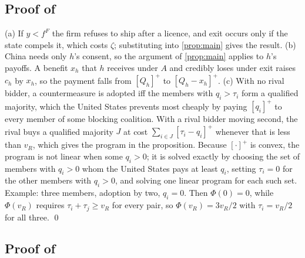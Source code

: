 \subsection*{Proof of }

(a) If $y < f^F$ the firm refuses to ship after a licence, and exit occurs only if the state compels it, which costs $\zeta$; substituting into \cref{prop:main} gives the result.
(b) China needs only $h$'s consent, so the argument of \cref{prop:main} applies to $h$'s payoffs. A benefit $x_h$ that $h$ receives under $A$ and credibly loses under exit raises $c_h$ by $x_h$, so the payment falls from $[Q_h]^+$ to $[Q_h - x_h]^+$.
(c) With no rival bidder, a countermeasure is adopted iff the members with $q_i>\tau_i$ form a qualified majority, which the United States prevents most cheaply by paying $[q_i]^+$ to every member of some blocking coalition. With a rival bidder moving second, the rival buys a qualified majority $J$ at cost $\sum_{i\in J}[\tau_i - q_i]^+$ whenever that is less than $v_R$, which gives the program in the proposition. Because $[\cdot]^+$ is convex, the program is not linear when some $q_i>0$; it is solved exactly by choosing the set of members with $q_i>0$ whom the United States pays at least $q_i$, setting $\tau_i=0$ for the other members with $q_i>0$, and solving one linear program for each such set. Example: three members, adoption by two, $q_i = 0$. Then $\Phi(0)=0$, while $\Phi(v_R)$ requires $\tau_i + \tau_j \geq v_R$ for every pair, so $\Phi(v_R) = 3v_R/2$ with $\tau_i = v_R/2$ for all three. \qed

\subsection*{Proof of }

